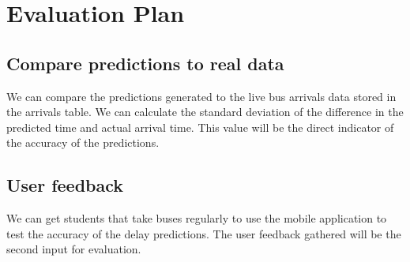 \chapter{Evaluation Plan}

\section{Compare predictions to real data}
We can compare the predictions generated to the live bus arrivals data stored in the arrivals table. We can calculate the standard deviation of the difference in the predicted time and actual arrival time. This value will be the direct indicator of the accuracy of the predictions.

\section{User feedback}
We can get students that take buses regularly to use the mobile application to test the accuracy of the delay predictions. The user feedback gathered will be the second input for evaluation.